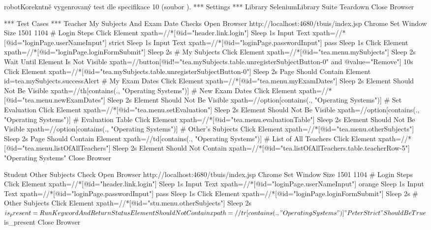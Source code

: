 \documentclass[czech, ma, kiv, he, iso690alph, pdf, viewonly]{fasthesis}
\begin{document}
    \begin{code}{robot}{Korekntně vygenrovaný test dle specifikace 10 (soubor ). \label{lst:gpt4:spec-10-3}}
*** Settings ***
Library           SeleniumLibrary
Suite Teardown    Close Browser

*** Test Cases ***
Teacher My Subjects And Exam Date Checks
    Open Browser    http://localhost:4680/tbuis/index.jsp    Chrome
    Set Window Size    1501    1104
    # Login Steps
    Click Element    xpath=//*[@id="header.link.login"]
    Sleep    1s
    Input Text    xpath=//*[@id="loginPage.userNameInput"]    strict
    Sleep    1s
    Input Text    xpath=//*[@id="loginPage.passwordInput"]    pass
    Sleep    1s
    Click Element    xpath=//*[@id="loginPage.loginFormSubmit"]
    Sleep    2s
    # My Subjects
    Click Element    xpath=//*[@id="tea.menu.mySubjects"]
    Sleep    2s
    Wait Until Element Is Not Visible    xpath=//button[@id!="tea.mySubjects.table.unregisterSubjectButton-0" and @value="Remove"]    10s
    Click Element    xpath=//*[@id="tea.mySubjects.table.unregisterSubjectButton-0"]
    Sleep    2s
    Page Should Contain Element    id=tea.mySubjects.successAlert
    # My Exam Dates
    Click Element    xpath=//*[@id="tea.menu.myExamDates"]
    Sleep    2s
    Element Should Not Be Visible    xpath=//th[contains(., "Operating Systems")]
    # New Exam Dates
    Click Element    xpath=//*[@id="tea.menu.newExamDates"]
    Sleep    2s
    Element Should Not Be Visible    xpath=//option[contains(., "Operating Systems")]
    # Set Evaluation
    Click Element    xpath=//*[@id="tea.menu.setEvaluation"]
    Sleep    2s
    Element Should Not Be Visible    xpath=//option[contains(., "Operating Systems")]
    # Evaluation Table
    Click Element    xpath=//*[@id="tea.menu.evaluationTable"]
    Sleep    2s
    Element Should Not Be Visible    xpath=//option[contains(., "Operating Systems")]
    # Other's Subjects
    Click Element    xpath=//*[@id="tea.menu.otherSubjects"]
    Sleep    2s
    Page Should Contain Element    xpath=//td[contains(., "Operating Systems")]
    # List of All Teachers
    Click Element    xpath=//*[@id="tea.menu.listOfAllTeachers"]
    Sleep    2s
    Element Should Not Contain    xpath=//*[@id="tea.listOfAllTeachers.table.teacherRow-5"]    "Operating Systems"
    Close Browser

Student Other Subjects Check
    Open Browser    http://localhost:4680/tbuis/index.jsp    Chrome
    Set Window Size    1501    1104
    # Login Steps
    Click Element    xpath=//*[@id="header.link.login"]
    Sleep    1s
    Input Text    xpath=//*[@id="loginPage.userNameInput"]    orange
    Sleep    1s
    Input Text    xpath=//*[@id="loginPage.passwordInput"]    pass
    Sleep    1s
    Click Element    xpath=//*[@id="loginPage.loginFormSubmit"]
    Sleep    2s
    # Other Subjects
    Click Element    xpath=//*[@id="stu.menu.otherSubjects"]
    Sleep    2s
    ${is_present}=    Run Keyword And Return Status    Element Should Not Contain    xpath=//tr[contains(., "Operating Systems")]    "Peter Strict"
    Should Be True    ${is_present}
    Close Browser\end{code}
\end{document}
